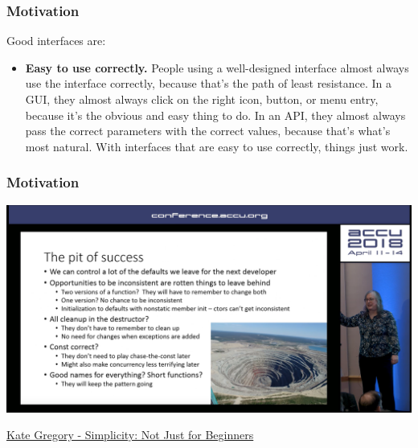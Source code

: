 \documentclass[aspectratio=169]{beamer}
\begin{document}
\begin{frame}

  \frametitle{Motivation}
  
  Good interfaces are:
  \begin{itemize}
    \item \textbf{Easy to use correctly.} People using a well-designed interface almost always use the interface correctly, because that's the path of least resistance. In a GUI, they almost always click on the right icon, button, or menu entry, because it's the obvious and easy thing to do. In an API, they almost always pass the correct parameters with the correct values, because that's what's most natural. With interfaces that are easy to use correctly, things just work.
  \end{itemize}
  

\end{frame}

\begin{frame}
  \frametitle{Motivation}
  
  \begin{center}
  \includegraphics[height=.75\textheight]{resources/kate_pit_of_success.jpg}
  \end{center}

  \href{https://youtu.be/O50qTuM5OT0?t=3460}{Kate Gregory - Simplicity: Not Just for Beginners}

\end{frame}
\end{document}
